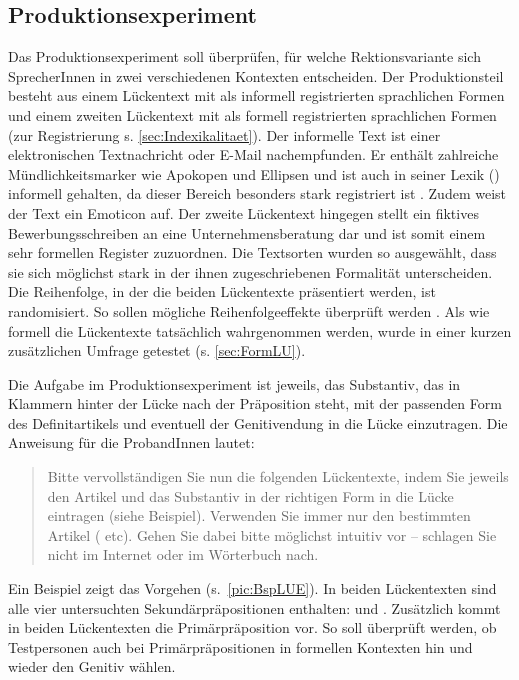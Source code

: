 \subsection{Produktionsexperiment} 
\label{sec:LU}
Das Produktionsexperiment soll überprüfen, für welche Rektionsvariante sich SprecherInnen in zwei verschiedenen Kontexten entscheiden. 
Der Produktionsteil besteht aus einem Lückentext mit als informell registrierten sprachlichen Formen und einem zweiten Lückentext mit als formell registrierten sprachlichen Formen (zur Registrierung s. \autoref{sec:Indexikalitaet}). 
Der informelle Text ist einer elektronischen Textnachricht oder E-Mail nachempfunden. 
Er enthält zahlreiche Mündlichkeitsmarker wie Apokopen und Ellipsen und ist auch in seiner Lexik () informell gehalten, da dieser Bereich besonders stark registriert ist \citep[s.][88]{Halliday1964}. 
Zudem weist der Text ein Emoticon auf. 
Der zweite Lückentext hingegen stellt ein fiktives Bewerbungsschreiben an eine Unternehmensberatung dar und ist somit einem sehr formellen Register zuzuordnen. 
Die Textsorten wurden so ausgewählt, dass sie sich möglichst stark in der ihnen zugeschriebenen Formalität unterscheiden.  
Die Reihenfolge, in der die beiden Lückentexte präsentiert werden, ist randomisiert. So sollen mögliche Reihenfolgeeffekte überprüft werden \citep[s.][37--38]{Porst2014}. 
Als wie formell die Lückentexte tatsächlich wahrgenommen werden, wurde in einer kurzen zusätzlichen Umfrage getestet (s. \autoref{sec:FormLU}).

Die Aufgabe %
im Produktionsexperiment ist jeweils, das Substantiv, das in Klammern hinter der Lücke nach der Prä\-po\-si\-tion steht, mit der passenden Form des Definitartikels und eventuell der Geni\-tiv\-end\-ung in die Lücke einzutragen. Die Anweisung für die ProbandInnen lautet: 
\begin{quote}\glqq Bitte vervollständigen Sie nun die folgenden Lückentexte, indem Sie jeweils den Artikel und das Substantiv in der richtigen Form in die Lücke eintragen (siehe Beispiel). Verwenden Sie immer nur den bestimmten Artikel ( etc). Gehen Sie dabei bitte möglichst intuitiv vor -- schlagen Sie nicht im Internet oder im Wörterbuch nach.\grqq{}\end{quote}

Ein Beispiel zeigt das Vorgehen (s.~\autoref{pic:BspLUE}). In beiden Lückentexten sind alle vier untersuchten Sekundärpräpositionen enthalten:  und . Zusätzlich kommt in beiden Lückentexten die Primärpräposition  vor. So soll überprüft werden, ob Testpersonen auch bei Primärpräpositionen in formellen Kontexten hin und wieder den Genitiv wählen.

